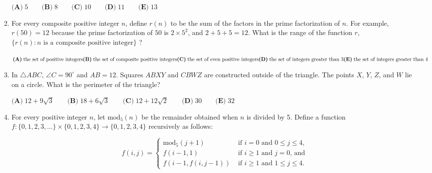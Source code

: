 \documentclass{article}
\begin{document}
\begin{enumerate}[label=\arabic*., itemsep=0.5em]
\(\textbf{(A)}\; 5 \qquad\textbf{(B)}\; 8 \qquad\textbf{(C)}\; 10 \qquad\textbf{(D)}\; 11 \qquad\textbf{(E)}\; 13\)\par \vspace{0.5em}\item For every composite positive integer \(n\), define \(r(n)\) to be the sum of the factors in the prime factorization of \(n\). For example, \(r(50) = 12\) because the prime factorization of \(50\) is \(2 \times 5^{2}\), and \(2 + 5 + 5 = 12\). What is the range of the function \(r\), \(\{r(n): n \text{ is a composite positive integer}\}\) ?

\(\textbf{(A)}\; \text{the set of positive integers} \\
\textbf{(B)}\; \text{the set of composite positive integers} \\
\textbf{(C)}\; \text{the set of even positive integers} \\
\textbf{(D)}\; \text{the set of integers greater than 3} \\
\textbf{(E)}\; \text{the set of integers greater than 4}\)\par \vspace{0.5em}\item In \(\triangle ABC\), \(\angle C = 90^\circ\) and \(AB = 12\). Squares \(ABXY\) and \(CBWZ\) are constructed outside of the triangle. The points \(X\), \(Y\), \(Z\), and \(W\) lie on a circle. What is the perimeter of the triangle?

\(\textbf{(A)}\; 12+9\sqrt{3} \qquad\textbf{(B)}\; 18+6\sqrt{3} \qquad\textbf{(C)}\; 12+12\sqrt{2} \qquad\textbf{(D)}\; 30 \qquad\textbf{(E)}\; 32\)\par \vspace{0.5em}\item For every positive integer \(n\), let \(\text{mod}_5 (n)\) be the remainder obtained when \(n\) is divided by 5. Define a function \(f: \{0,1,2,3,\dots\} \times \{0,1,2,3,4\} \to \{0,1,2,3,4\}\) recursively as follows:


\begin{equation*}
f(i,j) = \begin{cases}\text{mod}_5 (j+1) & \text{ if } i = 0 \text{ and } 0 \le j \le 4 \text{,}\\
f(i-1,1) & \text{ if } i \ge 1 \text{ and } j = 0 \text{, and} \\
f(i-1, f(i,j-1)) & \text{ if } i \ge 1 \text{ and } 1 \le j \le 4.
\end{cases}
\end{equation*}
  


\end{enumerate}
\end{document}
